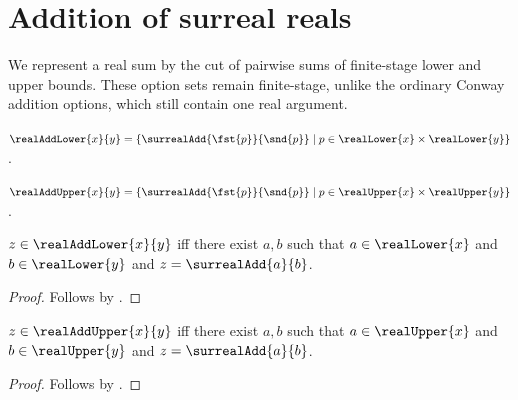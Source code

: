 

\section{Addition of surreal reals}

We represent a real sum by the cut of pairwise sums of finite-stage lower and
upper bounds.  These option sets remain finite-stage, unlike the ordinary
Conway addition options, which still contain one real argument.

\begin{definition}\label{surreal_real_add_lower}
    $\realAddLower{x}{y}=
        \{\surrealAdd{\fst{p}}{\snd{p}}
            \mid p\in\realLower{x}\times\realLower{y}\}$.
\end{definition}

\begin{definition}\label{surreal_real_add_upper}
    $\realAddUpper{x}{y}=
        \{\surrealAdd{\fst{p}}{\snd{p}}
            \mid p\in\realUpper{x}\times\realUpper{y}\}$.
\end{definition}

\begin{proposition}\label{surreal_real_add_lower_iff}
    $z\in\realAddLower{x}{y}$ iff there exist $a,b$ such that
        $a\in\realLower{x}$ and $b\in\realLower{y}$ and
        $z=\surrealAdd{a}{b}$.
\end{proposition}
\begin{proof}
    Follows by
        .
\end{proof}

\begin{proposition}\label{surreal_real_add_upper_iff}
    $z\in\realAddUpper{x}{y}$ iff there exist $a,b$ such that
        $a\in\realUpper{x}$ and $b\in\realUpper{y}$ and
        $z=\surrealAdd{a}{b}$.
\end{proposition}
\begin{proof}
    Follows by
        .
\end{proof}

